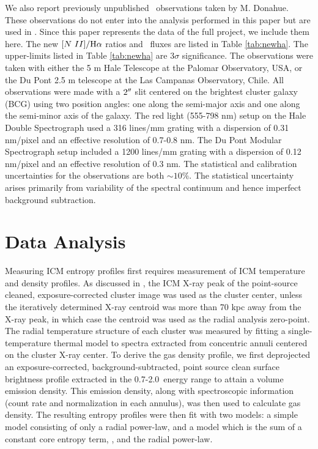 \documentclass[12pt,preprint]{aastex}
\begin{document}
We also report previously unpublished \halpha\ observations taken by
M. Donahue. These observations do not enter into the analysis
performed in this paper but are used in \citet{haradent}. Since this
paper represents the data of the full project, we include them
here. The new $[N~II]/\mathrm{H}\alpha$ ratios and \halpha\ fluxes are listed
in Table \ref{tab:newha}. The upper-limits listed in Table
\ref{tab:newha} are $3\sigma$ significance. The observations were
taken with either the 5 m Hale Telescope at the Palomar Observatory,
USA, or the Du Pont 2.5 m telescope at the Las Campanas Observatory,
Chile. All observations were made with a $2\mathrm{^\prime}\hskip -0.1em\mathrm{^\prime}$ slit centered on the
brightest cluster galaxy (BCG) using two position angles: one along
the semi-major axis and one along the semi-minor axis of the
galaxy. The red light (555-798 nm) setup on the Hale Double
Spectrograph used a 316 lines/mm grating with a dispersion of 0.31
nm/pixel and an effective resolution of 0.7-0.8 nm. The Du Pont
Modular Spectrograph setup included a 1200 lines/mm grating with a
dispersion of 0.12 nm/pixel and an effective resolution of 0.3 nm. The
statistical and calibration uncertainties for the observations are
both $\sim 10\%$. The statistical uncertainty arises primarily from
variability of the spectral continuum and hence imperfect background
subtraction.

\section{Data Analysis}
\label{sec:data}

Measuring ICM entropy profiles first requires measurement of ICM
temperature and density profiles. As discussed in \citet{xrayband},
the ICM X-ray peak of the point-source cleaned, exposure-corrected
cluster image was used as the cluster center, unless the iteratively
determined X-ray centroid was more than 70 kpc away from the X-ray
peak, in which case the centroid was used as the radial analysis
zero-point. The radial temperature structure of each cluster was
measured by fitting a single-temperature thermal model to spectra
extracted from concentric annuli centered on the cluster X-ray
center. To derive the gas density profile, we first deprojected an
exposure-corrected, background-subtracted, point source clean surface
brightness profile extracted in the 0.7-2.0\keV\ energy range to
attain a volume emission density. This emission density, along with
spectroscopic information (count rate and normalization in each
annulus), was then used to calculate gas density. The resulting
entropy profiles were then fit with two models: a simple model
consisting of only a radial power-law, and a model which is the sum of
a constant core entropy term, \kna, and the radial power-law.
\end{document}
